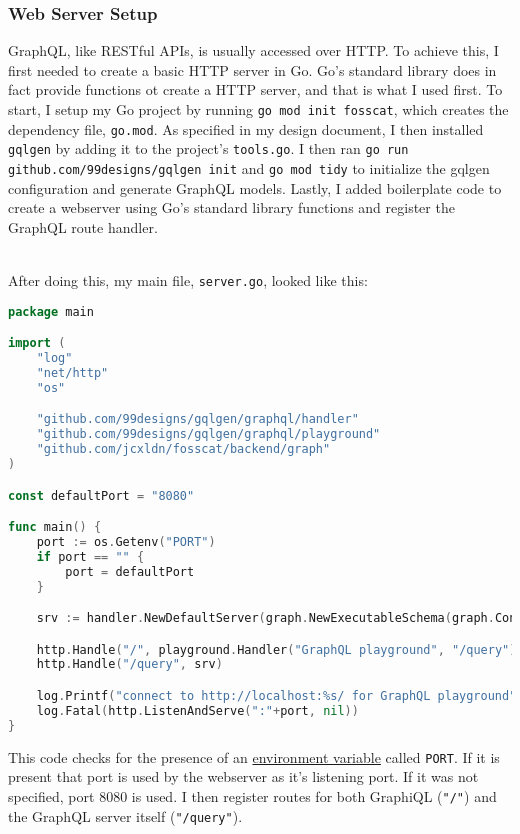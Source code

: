 \documentclass[../../main.tex]{subfiles}
\begin{document}
\subsubsection{Web Server Setup}

GraphQL, like RESTful APIs, is usually accessed over HTTP. To achieve this, I first needed to create a basic HTTP server in Go.
Go's standard library does in fact provide functions ot create a HTTP server, and that is what I used first.
To start, I setup my Go project by running \lstinline{go mod init fosscat}, which creates the dependency file, \lstinline{go.mod}.
As specified in my design document, I then installed \lstinline{gqlgen} by adding it to the project's \lstinline{tools.go}.
I then ran \lstinline{go run github.com/99designs/gqlgen init} and \lstinline{go mod tidy} to initialize the gqlgen configuration and generate
GraphQL models. Lastly, I added boilerplate code to create a webserver using Go's standard library functions and register the GraphQL route handler.

\noindent \\ After doing this, my main file, \lstinline{server.go}, looked like this:

\begin{lstlisting}[language=Go]
package main

import (
	"log"
	"net/http"
	"os"

	"github.com/99designs/gqlgen/graphql/handler"
	"github.com/99designs/gqlgen/graphql/playground"
	"github.com/jcxldn/fosscat/backend/graph"
)

const defaultPort = "8080"

func main() {
	port := os.Getenv("PORT")
	if port == "" {
		port = defaultPort
	}

	srv := handler.NewDefaultServer(graph.NewExecutableSchema(graph.Config{Resolvers: &graph.Resolver{}}))

	http.Handle("/", playground.Handler("GraphQL playground", "/query"))
	http.Handle("/query", srv)

	log.Printf("connect to http://localhost:%s/ for GraphQL playground", port)
	log.Fatal(http.ListenAndServe(":"+port, nil))
}

\end{lstlisting}

\noindent This code checks for the presence of an \underline{environment variable} called \lstinline{PORT}. If it is present that port is used by the webserver as it's listening port. If it was not specified, port 8080 is used.
I then register routes for both GraphiQL (\lstinline{"/"}) and the GraphQL server itself (\lstinline{"/query"}).
\end{document}
